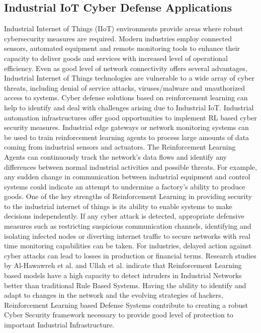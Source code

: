 \documentclass[12pt]{article}
\begin{document}
\subsection{Industrial IoT Cyber Defense Applications}
Industrial Internet of Things (IIoT) environments provide areas where robust cybersecurity measures are required. Modern industries employ connected sensors, automated equipment and remote monitoring tools to enhance their capacity to deliver goods and services with increased level of operational efficiency. Even as good level of network connectivity offers several advantages, Industrial Internet of Things technologies are vulnerable to a wide array of cyber threats, including denial of service attacks, viruses/malware and unauthorized access to systems. \cite{Wang2024}
Cyber defense solutions based on reinforcement learning can help to identify and deal with challenges arising due to Industrial IoT.
Industrial automation infrastructures offer good opportunities to implement RL based cyber security measures. Industrial edge gateways or network monitoring systems can be used to train reinforcement learning agents to process large amounts of data coming from industrial sensors and actuators. The Reinforcement Learning Agents can continuously track the network's data flows and identify any differences between normal industrial activities and possible threats. For example, any sudden change in communication between industrial equipment and control systems could indicate an attempt to undermine a factory's ability to produce goods. 
One of the key strengths of Reinforcement Learning in providing security to the industrial internet of things is its ability to enable systems to make decisions independently. If any cyber attack is detected, appropriate defensive measures such as restricting suspicious communication channels, identifying and isolating infected nodes or diverting internet traffic to secure networks with real time monitoring capabilities can be taken.
For industries, delayed action against cyber attacks can lead to losses in production or financial terms. Research studies by Al-Hawawreh et al. and Ullah et al. indicate that Reinforcement Learning based models have a high capacity to detect intruders in Industrial Networks better than traditional Rule Based Systems. Having the ability to identify and adapt to changes in the network and the evolving strategies of hackers, Reinforcement Learning based Defense Systems contribute to creating a robust Cyber Security framework necessary to provide good level of protection to important Industrial Infrastructure.\cite{Alnfiai2025, Ogenyi2025, Jamshidi2025, Khan2023}
\end{document}

